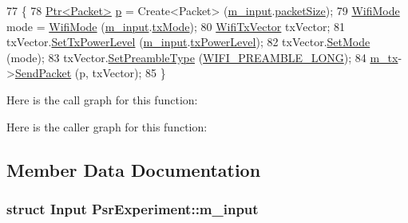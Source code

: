 \begin{DoxyCode}
77 \{
78   \hyperlink{classns3_1_1Ptr}{Ptr<Packet>} \hyperlink{lte__link__budget_8m_ac9de518908a968428863f829398a4e62}{p} = Create<Packet> (\hyperlink{classPsrExperiment_a8892dc34592cc5f5f51dbf172078d7a3}{m\_input}.\hyperlink{structPsrExperiment_1_1Input_ae43b0fd5bf26ec81497ee109183ec771}{packetSize});
79   \hyperlink{classns3_1_1WifiMode}{WifiMode} mode = \hyperlink{classns3_1_1WifiMode}{WifiMode} (\hyperlink{classPsrExperiment_a8892dc34592cc5f5f51dbf172078d7a3}{m\_input}.\hyperlink{structPsrExperiment_1_1Input_a2d2c2e64976db022d21b26e8c0897846}{txMode});
80   \hyperlink{classns3_1_1WifiTxVector}{WifiTxVector} txVector;
81   txVector.\hyperlink{classns3_1_1WifiTxVector_a25743cd89a5cb95ec22a9e584fa044f3}{SetTxPowerLevel} (\hyperlink{classPsrExperiment_a8892dc34592cc5f5f51dbf172078d7a3}{m\_input}.\hyperlink{structPsrExperiment_1_1Input_ac1d2b3dc5b6b3291a888af9aef549e86}{txPowerLevel});
82   txVector.\hyperlink{classns3_1_1WifiTxVector_af39f17fec348c22f8c963bcb6bb5fc53}{SetMode} (mode);
83   txVector.\hyperlink{classns3_1_1WifiTxVector_afa5117513e1a7bfa717c3d7556192525}{SetPreambleType} (\hyperlink{group__wifi_gga5e94a56cb338a14ffbbb19c6a41251eba12f3d9468d1630bd38bbef20df1e3eda}{WIFI\_PREAMBLE\_LONG});
84   \hyperlink{classPsrExperiment_a25ce1f8accba8869a380f77e93090dca}{m\_tx}->\hyperlink{classns3_1_1WifiPhy_a4caf22eb334a9caca21ec37d90a74ce2}{SendPacket} (p, txVector);
85 \}
\end{DoxyCode}


Here is the call graph for this function\+:




Here is the caller graph for this function\+:




\subsection{Member Data Documentation}
\subsubsection[{\texorpdfstring{m\+\_\+input}{m_input}}]{\setlength{\rightskip}{0pt plus 5cm}struct {\bf Input} Psr\+Experiment\+::m\+\_\+input\hspace{0.3cm}{\ttfamily [private]}}\hypertarget{classPsrExperiment_a8892dc34592cc5f5f51dbf172078d7a3}{}\label{classPsrExperiment_a8892dc34592cc5f5f51dbf172078d7a3}


